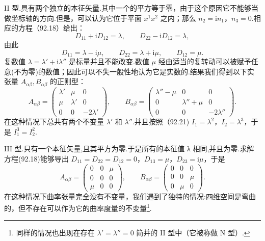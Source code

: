 II 型.具有两个独立的本征矢量.其中一个的平方等于零，由于这个原因它不能够当做坐标轴的方向.但是，可以认为它位于平面 $x^1x^2$ 之内；那么 $n_2=\mathrm{i}n_1$，$n_3=0$.相应的方程（92.18）给出：
\begin{equation*}
  D_{11}+\mathrm{i}D_{12}=\lambda,\qquad
  D_{22}-\mathrm{i}D_{12}=\lambda,
\end{equation*}
由此
\begin{equation*}
  D_{11}=\lambda-\mathrm{i}\mu,\qquad
  D_{22}=\lambda+\mathrm{i}\mu,\qquad
  D_{12}=\mu.
\end{equation*}
复数值 $\lambda=\lambda'+\mathrm{i}\lambda''$ 是标量并且不能改变.数值 $\mu$ 经由适当的复转动可以被赋予任意(不为零)的数值；因此可以不失一般性地认为它是实数的.结果我们得到以下实张量 $A_{\alpha\beta},B_{\alpha\beta}$ 的正则型：
\begin{equation}
  A_{\alpha\beta}=
  \begin{pmatrix}
    \lambda' & \mu & 0\\
    \mu & \lambda' & 0\\
    0 & 0 & -2\lambda'
  \end{pmatrix},\qquad
  B_{\alpha\beta}=
  \begin{pmatrix}
    \lambda''-\mu & 0 & 0\\
    0 & \lambda''+\mu & 0\\
    0 & 0 & -2\lambda''
  \end{pmatrix}.
\end{equation}
在这种情况下总共有两个不变量 $\lambda'$ 和 $\lambda''$.并且按照（92.21) $I_1=\lambda^2$，$I_2=\lambda^3$，于是 $I_1^3=I_2^2$.

III 型.只有一个本征矢量,且其平方为零.于是所有的本征值 λ 相同,并且为零.求解方程(92.18)能够导出 $D_{11}=D_{22}=D_{12}=0$，$D_{13}=\mu$，$D_{23}=\mathrm{i}\mu$，于是
\begin{equation}
  A_{\alpha\beta}=
  \begin{pmatrix}
    0 & 0 & \mu\\
    0 & 0 & 0\\
    \mu & 0 & 0
  \end{pmatrix},\qquad
  B_{\alpha\beta}=
  \begin{pmatrix}
    0 & 0 & 0\\
    0 & 0 & \mu\\
    0 & \mu & 0
  \end{pmatrix}.
\end{equation}
在这种情况下曲率张量完全没有不变量，我们遇到了独特的情况:四维空间是弯曲的，但不存在可以作为它的曲率度量的不变量\footnote{同样的情况也出现在存在 $\lambda'=\lambda''=0$ 简并的 II 型中（它被称做 N 型）.}.

